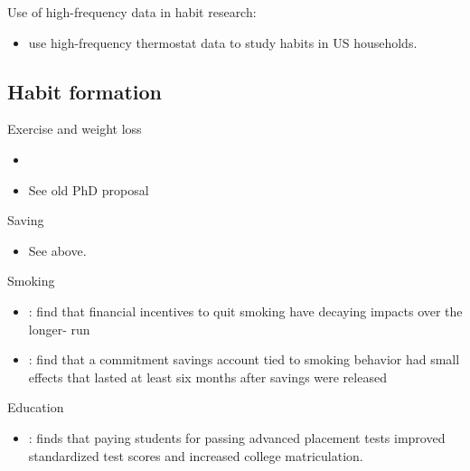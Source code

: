 \documentclass[a4paper, 11pt]{report}
\begin{document}
Use of high-frequency data in habit research:
\begin{itemize}
	\item \citet{ge2017energy} use high-frequency thermostat data to study habits in US households.
\end{itemize}


\subsection{Habit formation}

Exercise and weight loss
\begin{itemize}
	\item \citet{john2011financial}
	\item See old PhD proposal
\end{itemize}

Saving
\begin{itemize}
	\item See above.
\end{itemize}

Smoking
\begin{itemize}
	\item \citet{volpp2009randomized}: find that financial incentives to quit smoking have decaying impacts over the longer- run
	\item \citet{gine2010put}: find that a commitment savings account tied to smoking behavior had small effects that lasted at least six months after savings were released
\end{itemize}

Education
\begin{itemize}
	\item \citet{jackson2010little}: finds that paying students for passing advanced placement tests improved standardized test scores and increased college matriculation.
\end{itemize}
\end{document}
